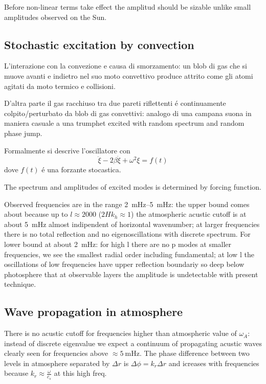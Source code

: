 \documentclass[../main.tex]{subfiles}
\begin{document}
Before non-linear terms take effect the amplitud should be sizable unlike small amplitudes observed on the Sun.

\subsection{Stochastic excitation by convection}

L'interazione con la convezione e causa di smorzamento: un blob di gas che si muove avanti e indietro nel suo moto convettivo produce attrito come gli atomi agitati da moto termico e collisioni.

D'altra parte il gas racchiuso tra due pareti riflettenti \'e continuamente colpito/perturbato da blob di gas convettivi: analogo di una campana suona in maniera casuale a una trumphet excited with random spectrum and random phase jump.

Formalmente si descrive l'oscillatore con
\begin{equation*}
\ddot{\xi}-2\beta\dot{\xi}+\omega^2\xi=f(t)
\end{equation*}
dove $f(t)$ \'e una forzante stocastica.

The spectrum and amplitudes of excited modes is determined by forcing function.

Observed frequencies are in the range \SIrange{2}{5}{\milli\hertz}: the upper bound comes about because up to $l\approx2000$ ($2Hk_h\approx1$) the atmospheric acustic cutoff is at about \SI{5}{\milli\hertz} almost indipendent of horizontal wavenumber; at larger frequencies there is no total reflection and no eigenoscillations with discrete spectrum. For lower bound at about \SI{2}{\milli\hertz}: for high l there are no p modes at smaller frequencies, we see the smallest radial order including fundamental; at low l the oscillations of low frequencies have upper reflection boundariy so deep below photosphere that at observable layers the amplitude is undetectable with present technique.


\subsection{Wave propagation in atmosphere}

There is no acustic cutoff for frequencies higher than atmospheric value of $\omega_A$: instead of discrete eigenvalue we expect a continuum of propagating acustic waves clearly seen for frequencies above $\approx\SI{5}{\milli\hertz}$. The phase difference between two levels in atmosphere separated by $\Delta r$ is $\Delta\phi=k_r\Delta r$ and icreases with frequencies because $k_r\approx\frac{\omega}{c_s}$ at this high freq.
\end{document}
